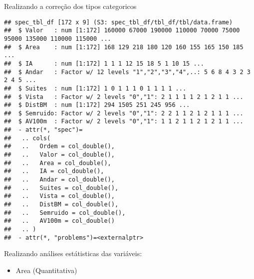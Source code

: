\documentclass[
]{article}
\newenvironment{Shaded}{\begin{snugshade}}{\end{snugshade}}
\newcommand{\ConstantTok}[1]{\textcolor[rgb]{0.00,0.00,0.00}{#1}}
\newcommand{\FunctionTok}[1]{\textcolor[rgb]{0.00,0.00,0.00}{#1}}
\newcommand{\NormalTok}[1]{#1}
\newcommand{\OtherTok}[1]{\textcolor[rgb]{0.56,0.35,0.01}{#1}}
\newcommand{\SpecialCharTok}[1]{\textcolor[rgb]{0.00,0.00,0.00}{#1}}
\providecommand{\tightlist}{%
  \setlength{\itemsep}{0pt}\setlength{\parskip}{0pt}}
\begin{document}
Realizando a correção dos tipos categoricos

\begin{Shaded}
\end{Shaded}

\begin{verbatim}
## spec_tbl_df [172 x 9] (S3: spec_tbl_df/tbl_df/tbl/data.frame)
##  $ Valor   : num [1:172] 160000 67000 190000 110000 70000 75000 95000 135000 110000 115000 ...
##  $ Area    : num [1:172] 168 129 218 180 120 160 155 165 150 185 ...
##  $ IA      : num [1:172] 1 1 1 12 15 18 5 1 10 15 ...
##  $ Andar   : Factor w/ 12 levels "1","2","3","4",..: 5 6 8 4 3 2 3 2 4 5 ...
##  $ Suites  : num [1:172] 1 0 1 1 1 0 1 1 1 1 ...
##  $ Vista   : Factor w/ 2 levels "0","1": 2 1 1 1 1 2 1 2 1 1 ...
##  $ DistBM  : num [1:172] 294 1505 251 245 956 ...
##  $ Semruido: Factor w/ 2 levels "0","1": 2 2 1 1 2 1 2 1 1 1 ...
##  $ AV100m  : Factor w/ 2 levels "0","1": 1 1 2 1 1 2 1 2 1 1 ...
##  - attr(*, "spec")=
##   .. cols(
##   ..   Ordem = col_double(),
##   ..   Valor = col_double(),
##   ..   Area = col_double(),
##   ..   IA = col_double(),
##   ..   Andar = col_double(),
##   ..   Suites = col_double(),
##   ..   Vista = col_double(),
##   ..   DistBM = col_double(),
##   ..   Semruido = col_double(),
##   ..   AV100m = col_double()
##   .. )
##  - attr(*, "problems")=<externalptr>
\end{verbatim}

Realizando análises estátisticas das variáveis:

\begin{itemize}
\tightlist
\item
  Area (Quantitativa)
\end{itemize}
\end{document}
